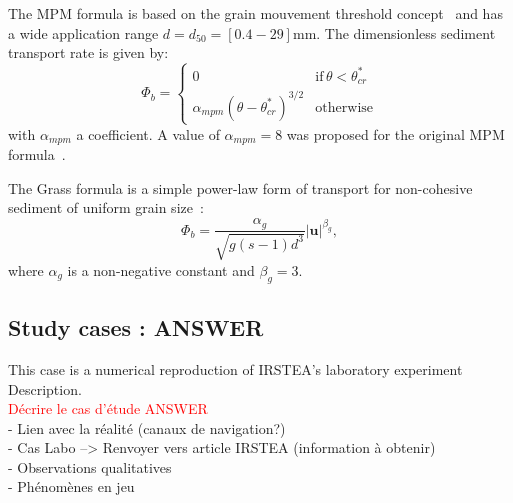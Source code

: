 The MPM formula is based on the grain mouvement threshold concept~\cite{meyer1948formulas, doi:10.1061/9780784408148} and has a wide application range $d=d_{50} = [0.4-29]$mm. The dimensionless sediment transport rate is given by:
\begin{equation}\label{eq:MPM}
\Phi_b=\left\{\begin{array}{ll}
0 & \text{if}\,\theta<\theta_{cr}^*\\
\alpha_{mpm}(\theta-\theta_{cr}^*)^{3/2} & \text{otherwise}
\end{array}
\right.
\end{equation}
with $\alpha_{mpm}$ a coefficient. A value of $\alpha_{mpm} = 8$ was proposed for the original MPM formula~\cite{meyer1948formulas, doi:10.1061/9780784408148}.%

The Grass formula is a simple power-law form of transport for non-cohesive sediment of uniform grain size~\cite{Grass81}: 
\begin{equation}\label{eq:grass}
\Phi_b = \frac{\alpha_{g}}{\sqrt{g(s-1)d^3}} |\mathbf u|^{\beta_{g}},%
\end{equation}
where $\alpha_{g}$ is a non-negative constant and $\beta_{g}=3$.




\subsection{Study cases : ANSWER}
This case is a numerical reproduction of IRSTEA's laboratory experiment \cite{bib3}
\\
Description.
\\
\textcolor{red}{Décrire le cas d'étude ANSWER} \\
- Lien avec la réalité (canaux de navigation?) \\
- Cas Labo --> Renvoyer vers article IRSTEA (information à obtenir) \\
- Observations qualitatives  \\
- Phénomènes en jeu \\

